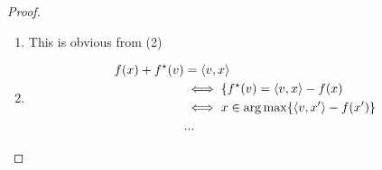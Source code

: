 \begin{proof}
  \begin{enumerate}
  \item This is obvious from (2)
  \item
    \begin{align}
      \label{eq:59}
      f(x) + f^{\star}(v) &= \langle v, x \rangle \\
      &\iff \{ f^{\star}(v) = \langle v, x \rangle - f(x)  \\
      &\iff x \in \operatorname*{arg\,max} \{ \langle v, x' \rangle - f(x') \}  \\
      &...
    \end{align}
  \end{enumerate}
\end{proof}

